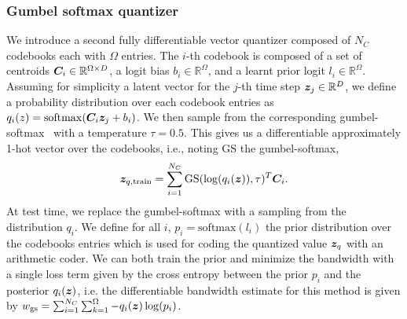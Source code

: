 
\subsubsection{Gumbel softmax quantizer}
\label{sec:model:gs}

We introduce a second fully differentiable vector quantizer
composed of $N_C$ codebooks each with $\Omega$ entries. The $i$-th codebook is composed of a set of centroids $\bm{C}_i\in \mathbb{R}^{\Omega\times D}$, a logit bias $b_i\in \mathbb{R}^{\Omega}$, and a learnt prior logit $l_i \in \mathbb{R}^{\Omega}$. Assuming for simplicity a latent vector for the $j$-th time step $\bm{z}_j \in\mathbb{R}^D$, we define a probability distribution over each codebook entries as $q_i(z) = \mathrm{softmax}(\bm{C}_i \bm{z}_j + b_i)$. We then sample from the corresponding gumbel-softmax~\citep{jang2016categorical} with a temperature $\tau = 0.5$. This gives
us a differentiable approximately 1-hot vector over the codebooks, i.e., noting $\mathrm{GS}$ the gumbel-softmax,
\begin{equation}
    \bm{z}_{q, \mathrm{train}} = \sum_{i=1}^{N_C} \mathrm{GS}(\log(q_i(\bm{z})), \tau)^T \bm{C}_i.
\end{equation}
At test time, we replace the gumbel-softmax with a sampling from the distribution $q_i$. We define for all $i$, $p_i = \mathrm{softmax}(l_i)$ the prior
distribution over the codebooks entries which is used for coding the quantized value $\bm{z}_q$ with an arithmetic coder. 
We can both train the prior and minimize the bandwidth with a single 
loss term given by the cross entropy between the prior $p_i$ and the posterior $q_i(\bm{z})$, i.e. the differentiable bandwidth estimate for this method is given by $w_\mathrm{gs} = \sum_{i=1}^{N_C}  \sum_{k=1}^{\Omega} -q_i(\bm{z}) \log(p_i)$.



